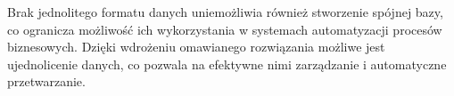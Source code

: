 Brak jednolitego formatu danych uniemożliwia również stworzenie spójnej bazy, co ogranicza możliwość ich wykorzystania w systemach automatyzacji procesów biznesowych. Dzięki wdrożeniu omawianego rozwiązania możliwe jest ujednolicenie danych, co pozwala na efektywne nimi zarządzanie i automatyczne przetwarzanie.